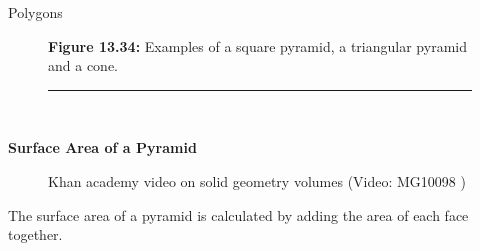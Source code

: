 \begin{exercises}{Polygons}
\begin{figure}[H]
\begin{center}
      \vspace{2pt}
    \vspace{\rubberspace}\par \begin{cnxcaption}
	  \small \textbf{Figure 13.34: }Examples of a square pyramid, a triangular pyramid and a cone.
	\end{cnxcaption}
      
    \vspace{.1in}
    \rule[.1in]{\figurerulewidth}{.005in} \\
        
    \end{center}

 \end{figure}   

    \addtocounter{footnote}{-0}
    
      \label{m39357*id62647}
        \textbf{Surface Area of a Pyramid}
      \par 
      \label{m39357*eip-485}
    \setcounter{subfigure}{0}


	\begin{figure}[H] %
    
    
    \textnormal{Khan academy video on solid geometry volumes}\vspace{.1in} \nopagebreak
  \label{m39357*yt-media1}\label{m39357*yt-video1}
             { (Video:  MG10098 )}
      
      \vspace{2pt}
    \vspace{.1in}
    
    

 \end{figure}   

    \addtocounter{footnote}{-0}
    \par \label{m39357*id62653}The surface area of a pyramid is calculated by adding the area of each face together.\par 
\label{m39357*secfhsst!!!underscore!!!id97}\vspace{.5cm} 
      

\end{exercises}
